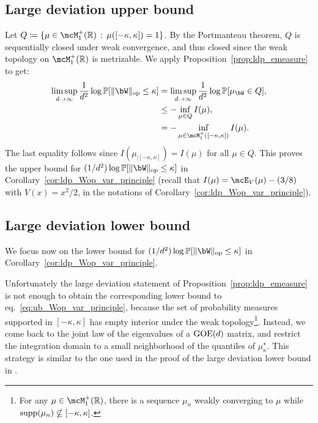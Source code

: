 \subsection{Large deviation upper bound}\label{subsec:ldp_Wop_ub}


\myskip
Let $Q \coloneqq \{\mu \in \mcM_1^+(\bbR) \, : \, \mu([-\kappa, \kappa]) = 1\}$. 
By the Portmanteau theorem, $Q$ is sequentially closed under weak convergence, and thus closed since the weak topology on $\mcM_1^+(\bbR)$ is metrizable.
We apply Proposition~\ref{prop:ldp_emeasure} to get:
\begin{align}
    \label{eq:ub_Wop_var_principle}
    \nonumber
     \limsup_{d \to \infty} \frac{1}{d^2} \log \bbP[\|\bW\|_\op \leq \kappa] &=  \limsup_{d \to \infty} \frac{1}{d^2} \log \bbP[\mu_\bW \in Q] , \\ 
    \nonumber
     &\leq - \inf_{\mu \in Q} I(\mu), \\ 
     &= - \inf_{\mu \in \mcM_1^+([-\kappa,\kappa])} I(\mu).
\end{align}
The last equality follows since $I(\mu_{|[-\kappa,\kappa]}) = I(\mu)$ for all $\mu \in Q$.
This proves the upper bound for $(1/d^2) \log \bbP[\|\bW\|_\op \leq \kappa]$ in Corollary~\ref{cor:ldp_Wop_var_principle} (recall that $I(\mu) = \mcE_V(\mu) - (3/8)$ with $V(x) = x^2/2$, 
in the notations of Corollary~\ref{cor:ldp_Wop_var_principle}).

\subsection{Large deviation lower bound}

We focus now on the lower bound for $(1/d^2) \log \bbP[\|\bW\|_\op \leq \kappa]$ in Corollary~\ref{cor:ldp_Wop_var_principle}.

\myskip
Unfortunately the large deviation statement of Proposition~\ref{prop:ldp_emeasure} is not enough to obtain the corresponding lower bound to eq.~\eqref{eq:ub_Wop_var_principle}, 
because the set of probability measures supported in $[-\kappa,\kappa]$ has empty interior under the weak topology\footnote{For any $\mu \in \mcM_1^+(\bbR)$, there is a sequence $\mu_n$ weakly converging to $\mu$ while $ \operatorname*{supp}(\mu_n) \nsubseteq [-\kappa,\kappa]$.}. 
Instead, we come back to the joint law of the eigenvalues of a $\mathrm{GOE}(d)$ matrix, and 
restrict the integration domain to a small neighborhood of the quantiles of $\mu_\kappa^\star$.
This strategy is similar to the one used in the proof of the large deviation lower bound in \cite{arous1997large}.

